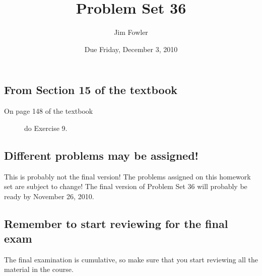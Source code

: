 \documentclass[12pt]{handout}
\author{Jim Fowler}
\title{Problem Set 36}
\date{Due Friday, December  3, 2010}
\begin{document}
\maketitle










\subsection*{From Section 15 of the textbook}



\begin{description}

\item[On page 148 of the textbook] do Exercise 9.

\end{description}




\subsection*{Different problems may be assigned!}
This is probably not the final version!  The problems assigned on this homework set are subject to change!  The final version of Problem Set 36 will probably be ready 
by November 26, 2010.










\subsection*{Remember to start reviewing for the final exam}
The final examination is cumulative, so make sure that you start reviewing all the material in the course.
\end{document}
